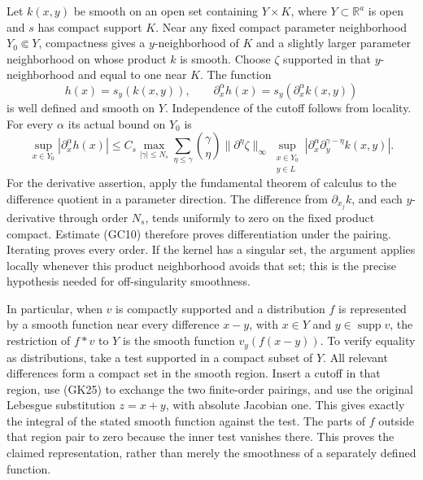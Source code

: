 \documentclass[
  11pt,
]{article}
\begin{document}
Let \(k(x,y)\) be smooth on an open set containing \(Y\times K\), where
\(Y\subset\mathbb R^a\) is open and \(s\) has compact support \(K\).
Near any fixed compact parameter neighborhood \(Y_0\Subset Y\),
compactness gives a \(y\)-neighborhood of \(K\) and a slightly larger
parameter neighborhood on whose product \(k\) is smooth. Choose
\(\zeta\) supported in that \(y\)-neighborhood and equal to one near
\(K\). The function \[
 h(x)=s_y(k(x,y)),\qquad
 \partial_x^\alpha h(x)=s_y(\partial_x^\alpha k(x,y))
 \tag{GC9}
\] is well defined and smooth on \(Y\). Independence of the cutoff
follows from locality. For every \(\alpha\) its actual bound on \(Y_0\)
is \[
 \sup_{x\in Y_0}|\partial_x^\alpha h(x)|
 \leq C_s\max_{|\gamma|\leq N_s}
 \sum_{\eta\leq\gamma}\binom{\gamma}{\eta}
 \|\partial^\eta\zeta\|_\infty
 \sup_{\substack{x\in Y_0\\y\in L}}
        |\partial_x^\alpha\partial_y^{\gamma-\eta}k(x,y)|.
 \tag{GC10}
\] For the derivative assertion, apply the fundamental theorem of
calculus to the difference quotient in a parameter direction. The
difference from \(\partial_{x_j}k\), and each \(y\)-derivative through
order \(N_s\), tends uniformly to zero on the fixed product compact.
Estimate (GC10) therefore proves differentiation under the pairing.
Iterating proves every order. If the kernel has a singular set, the
argument applies locally whenever this product neighborhood avoids that
set; this is the precise hypothesis needed for off-singularity
smoothness.

In particular, when \(v\) is compactly supported and a distribution
\(f\) is represented by a smooth function near every difference \(x-y\),
with \(x\in Y\) and \(y\in\operatorname{supp}v\), the restriction of
\(f*v\) to \(Y\) is the smooth function \(v_y(f(x-y))\). To verify
equality as distributions, take a test supported in a compact subset of
\(Y\). All relevant differences form a compact set in the smooth region.
Insert a cutoff in that region, use (GK25) to exchange the two
finite-order pairings, and use the original Lebesgue substitution
\(z=x+y\), with absolute Jacobian one. This gives exactly the integral
of the stated smooth function against the test. The parts of \(f\)
outside that region pair to zero because the inner test vanishes there.
This proves the claimed representation, rather than merely the
smoothness of a separately defined function.
\end{document}
